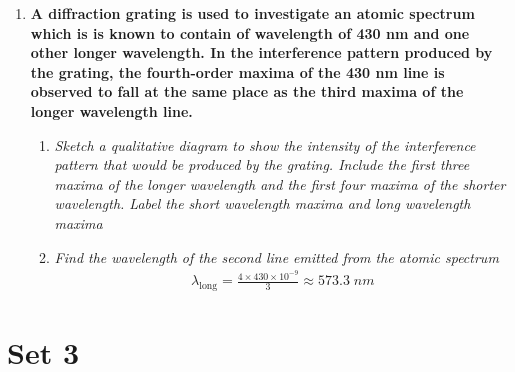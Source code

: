 \documentclass{report}
\begin{document}
\begin{enumerate}
			\item \textbf{A diffraction grating is used to investigate an atomic spectrum which is is known to contain of wavelength of 430 nm and one other longer wavelength. In the interference pattern produced by the grating, the fourth-order maxima of the 430 nm line is observed to fall at the same place as the third maxima of the longer wavelength line.}

				\begin{enumerate}
					\item \textit{Sketch a qualitative diagram to show the intensity of the interference pattern that would be produced by the grating. Include the first three maxima of the longer wavelength and the first four maxima of the shorter wavelength. Label the short wavelength maxima and long wavelength maxima}

					\item \textit{Find the wavelength of the second line emitted from the atomic spectrum}
						\begin{align*}
							\lambda_\text{long} = \frac{4 \times 430 \times 10^{-9}}{3} \approx 573.3 \; nm
						\end{align*}
				\end{enumerate}

		\end{enumerate}

	\section{Set 3}
\end{document}
